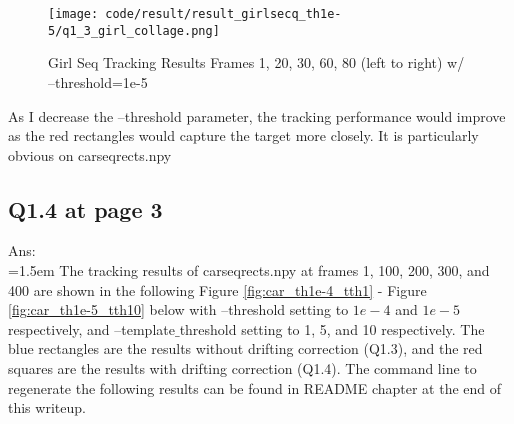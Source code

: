 \documentclass{article}
\begin{document}
	\begin{figure}[H]		
	\centering
	\texttt{[image: code/result/result\_girlsecq\_th1e-5/q1\_3\_girl\_collage.png]}  %
	\caption{Girl Seq Tracking Results Frames 1, 20, 30, 60, 80 (left to right) w/ --threshold=1e-5}
	\label{fig:girl_th1e-5}
	\end{figure}
	
	As I decrease the --threshold parameter, the tracking performance would improve as the red rectangles would capture the target more closely. It is particularly obvious on carseqrects.npy
	
	\newpage
	\subsection*{Q1.4 at page 3}
	Ans:\\
	\hangindent=1.5em \hspace{1.5em} The tracking results of carseqrects.npy at frames 1, 100, 200, 300, and 400 are shown in the following Figure \ref{fig:car_th1e-4_tth1} - Figure \ref{fig:car_th1e-5_tth10} below with --threshold setting to $1e-4$ and $1e-5$ respectively, and --template$\_$threshold setting to 1, 5, and 10 respectively. The blue rectangles are the results without drifting correction (Q1.3), and the red squares are the results with drifting correction (Q1.4). The command line to regenerate the following results can be found in README chapter at the end of this writeup.
	
\end{document}
